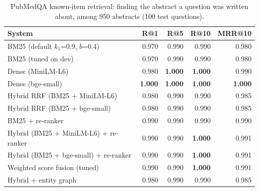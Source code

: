 \begin{table}[t]
\centering\small
\begin{tabular}{lrrrr}
\toprule
System & R@1 & R@5 & R@10 & MRR@10 \\
\midrule
BM25 (default $k_1$=0.9, $b$=0.4) & 0.970 & 0.990 & 0.990 & 0.980 \\
BM25 (tuned on dev) & 0.970 & 0.990 & 0.990 & 0.980 \\
Dense (MiniLM-L6) & 0.980 & \textbf{1.000} & \textbf{1.000} & 0.990 \\
Dense (bge-small) & \textbf{1.000} & \textbf{1.000} & \textbf{1.000} & \textbf{1.000} \\
Hybrid RRF (BM25 + MiniLM-L6) & 0.980 & 0.990 & 0.990 & 0.985 \\
Hybrid RRF (BM25 + bge-small) & 0.980 & 0.990 & 0.990 & 0.985 \\
BM25 + re-ranker & 0.990 & 0.990 & 0.990 & 0.990 \\
Hybrid (BM25 + MiniLM-L6) + re-ranker & 0.990 & 0.990 & \textbf{1.000} & 0.991 \\
Hybrid (BM25 + bge-small) + re-ranker & 0.990 & 0.990 & \textbf{1.000} & 0.991 \\
Weighted score fusion (tuned) & 0.990 & 0.990 & \textbf{1.000} & 0.991 \\
Hybrid + entity graph & 0.980 & 0.990 & 0.990 & 0.985 \\
\bottomrule
\end{tabular}
\caption{PubMedQA known-item retrieval: finding the abstract a question was written about, among 950 abstracts (100 test questions).}
\label{tab:retrieval_pubmedqa}
\end{table}
